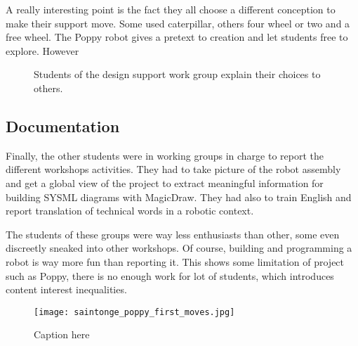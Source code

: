 A really interesting point is the fact they all choose a different conception to make their support move. Some used caterpillar, others four wheel or two and a free wheel. The Poppy robot gives a pretext to creation and let students free to explore. However

\begin{figure}[]
\centering
    \hfil
    \hfil
    \caption{Students of the design support work group explain their choices to others.}
    \label{fig:saintonge_support}
\end{figure}


\subsection{Documentation } %

Finally, the other students were in working groups in charge to report the different workshops activities. They had to take picture of the robot assembly and get a global view of the project to extract meaningful information for building SYSML diagrams with MagicDraw. They had also to train English and report translation of technical words in a robotic context.

The students of these groups were way less enthusiasts than other, some even discreetly sneaked into other workshops. Of course, building and programming a robot is way more fun than reporting it. This shows some limitation of project such as Poppy, there is no enough work for lot of students, which introduces content interest inequalities.

\begin{figure}[]
    \begin{center}
        \texttt{[image: saintonge\_poppy\_first\_moves.jpg]}
    \end{center}
    \caption{Caption here}
    \label{fig:saintonge_result}
\end{figure}

\begin{figure}[]
\centering
    \hfil
    \caption{}
    \label{fig:saintonge_demonstration}
\end{figure}



